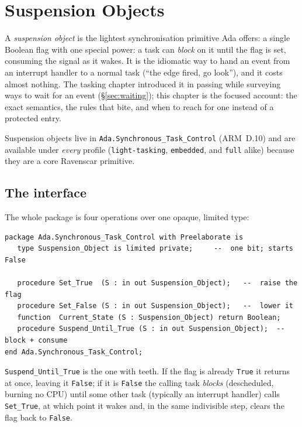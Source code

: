 \chapter{Suspension Objects}
\label{ch:suspension}

A \emph{suspension object} is the lightest synchronisation primitive Ada offers: a
single Boolean flag with one special power: a task can \emph{block} on it until
the flag is set, consuming the signal as it wakes. It is the idiomatic way to hand
an event from an interrupt handler to a normal task (``the edge fired, go look''),
and it costs almost nothing. The tasking chapter introduced it in passing while
surveying ways to wait for an event (\S\ref{sec:waiting}); this chapter is the
focused account: the exact semantics, the rules that bite, and when to reach for
one instead of a protected entry.

Suspension objects live in \texttt{Ada.Synchronous\_Task\_Control} (ARM~D.10) and
are available under \emph{every} profile (\texttt{light-tasking},
\texttt{embedded}, and \texttt{full} alike) because they are a core Ravenscar
primitive.

\section{The interface}

The whole package is four operations over one opaque, limited type:

\begin{lstlisting}
package Ada.Synchronous_Task_Control with Preelaborate is
   type Suspension_Object is limited private;     --  one bit; starts False

   procedure Set_True  (S : in out Suspension_Object);   --  raise the flag
   procedure Set_False (S : in out Suspension_Object);   --  lower it
   function  Current_State (S : Suspension_Object) return Boolean;
   procedure Suspend_Until_True (S : in out Suspension_Object);  --  block + consume
end Ada.Synchronous_Task_Control;
\end{lstlisting}

\texttt{Suspend\_Until\_True} is the one with teeth. If the flag is already
\texttt{True} it returns at once, leaving it \texttt{False}; if it is \texttt{False}
the calling task \emph{blocks} (descheduled, burning no CPU) until some other
task (typically an interrupt handler) calls \texttt{Set\_True}, at which point it
wakes and, in the same indivisible step, clears the flag back to \texttt{False}.

